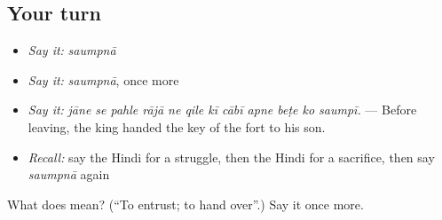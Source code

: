 \subsection*{Your turn}
\begin{itemize}
\raggedright
  \item \emph{Say it:} \emph{saumpnā}
  \item \emph{Say it:} \emph{saumpnā}, once more
  \item \emph{Say it:} \emph{jāne se pahle rājā ne qile kī cābī apne beṭe ko saumpī.} — Before leaving, the king handed the key of the fort to his son.
  \item \emph{Recall:} say the Hindi for a struggle, then the Hindi for a sacrifice, then say \emph{saumpnā} again
\end{itemize}

\begin{tcolorbox}[breakable,colback=teal!4,colframe=teal!35!black,title={Before you move on}]
What does  mean? (\textquotedblleft{}To entrust; to hand over\textquotedblright{}.) Say it once more.
\end{tcolorbox}
